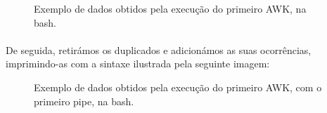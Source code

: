 \documentclass[11pt,a4paper]{report}
\begin{document}
\begin{figure}[H]
\centering
\noindent{}
\caption{Exemplo de dados obtidos pela execução do primeiro AWK, na bash.}
\end{figure}

\paragraph*{}De seguida, retirámos os duplicados e adicionámos as suas ocorrências, imprimindo-as com a sintaxe ilustrada pela seguinte imagem:

\begin{figure}[H]
\centering
\noindent{}
\caption{Exemplo de dados obtidos pela execução do primeiro AWK, com o primeiro pipe, na bash.}
\end{figure}
\end{document}
